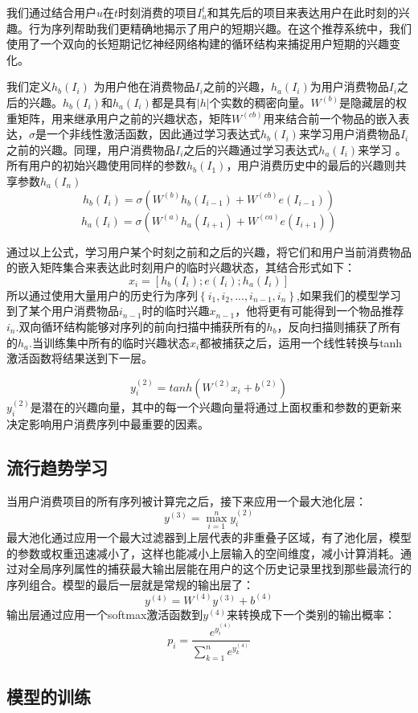 我们通过结合用户$u$在$t$时刻消费的项目$I_{u}^{t}$和其先后的项目来表达用户在此时刻的兴趣。行为序列帮助我们更精确地揭示了用户的短期兴趣。在这个推荐系统中，我们使用了一个双向的长短期记忆神经网络构建的循环结构来捕捉用户短期的兴趣变化。

我们定义$h_{b}(I_{i})$ 为用户他在消费物品$I_i$之前的兴趣，$h_{a}(I_{i})$为用户消费物品$I_i$之后的兴趣。$h_{b}(I_{i})$和$h_{a}(I_{i})$都是具有$|h|$个实数的稠密向量。$W^{(b)}$是隐藏层的权重矩阵，用来继承用户之前的兴趣状态，矩阵$W^{(cb)}$用来结合前一个物品的嵌入表达，$\sigma$是一个非线性激活函数，因此通过学习表达式$h_{b}(I_{i})$来学习用户消费物品$I_i$之前的兴趣。同理，用户消费物品$I_i$之后的兴趣通过学习表达式$h_{a}(I_{i})$来学习
。所有用户的初始兴趣使用同样的参数$h_{b}(I_{1})$，用户消费历史中的最后的兴趣则共享参数$h_{a}(I_{n})$
$$
h_{b}(I_{i})=\sigma (W^{(b)}h_{b}(I_{i-1})+W^{(cb)}e(I_{i-1}))
$$
$$
h_{a}(I_{i})=\sigma (W^{(a)}h_{a}(I_{i+1})+W^{(ca)}e(I_{i+1}))
$$

通过以上公式，学习用户某个时刻之前和之后的兴趣，将它们和用户当前消费物品的嵌入矩阵集合来表达此时刻用户的临时兴趣状态，其结合形式如下：
$$
x_{i}=[h_{b}(I_{i});e(I_{i});h_{a}(I_{i})]
$$
所以通过使用大量用户的历史行为序列$\left \{ i_{1},i_{2},...,i_{n-1},i_{n} \right \}$,如果我们的模型学习到了某个用户消费物品$i_{n-1}$时的临时兴趣$x_{n-1}$，他将更有可能得到一个物品推荐$i_{n}$.双向循环结构能够对序列的前向扫描中捕获所有的$h_b$，反向扫描则捕获了所有的$h_a$.当训练集中所有的临时兴趣状态$x_i$都被捕获之后，运用一个线性转换与tanh激活函数将结果送到下一层。

$$
y_{i}^{(2)}=tanh(W^{(2)}x_{i}+b^{(2)})
$$
$y_{i}^{(2)}$是潜在的兴趣向量，其中的每一个兴趣向量将通过上面权重和参数的更新来决定影响用户消费序列中最重要的因素。

\subsection{流行趋势学习}
当用户消费项目的所有序列被计算完之后，接下来应用一个最大池化层：
$$
y^{(3)}=\max_{i=1}^{n}y_{i}^{(2)}
$$
最大池化通过应用一个最大过滤器到上层代表的非重叠子区域，有了池化层，模型的参数或权重迅速减小了，这样也能减小上层输入的空间维度，减小计算消耗。通过对全局序列属性的捕获最大输出层能在用户的这个历史记录里找到那些最流行的序列组合。模型的最后一层就是常规的输出层了：
$$
y^{(4)}=W^{(4)}y^{(3)}+b^{(4)}
$$
输出层通过应用一个softmax激活函数到$y^{(4)}$来转换成下一个类别的输出概率：
$$
p_{i}= \frac{e^{y_{i}^{(4)}}}{\sum_{k=1}^{n}e^{y_{k}^{(4)}}}
$$

\subsection{模型的训练}

